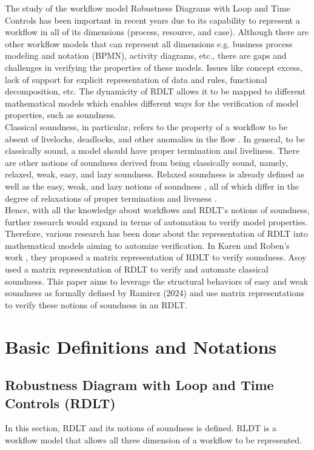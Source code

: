 \indent The study of the workflow model Robustness Diagrams with Loop and Time Controls has been important in recent years due to its capability to represent a workflow in all of its dimensions (process, resource, and case). Although there are other workflow models that can represent all dimensions e.g. business process modeling and notation (BPMN), activity diagrams, etc., there are gaps and challenges in verifying the properties of these models. Issues like concept excess, lack of support for explicit representation of data and rules, functional decomposition, etc. The dynamicity of RDLT allows it to be mapped to different mathematical models which enables different ways for the verification of model properties, such as soundness. \cite{Malinao2017} \\

\indent Classical soundness, in particular, refers to the property of a workflow to be absent of livelocks, deadlocks, and other anomalies in the flow \cite{Ramirez2024}. In general, to be classically sound, a model should have proper termination and liveliness. There are other notions of soundness derived from being classically sound, namely, relaxed, weak, easy, and lazy soundness. Relaxed soundness \cite{MalinaoPJS2023} is already defined as well as the easy, weak, and lazy notions of soundness \cite{Ramirez2024}, all of which differ in the degree of relaxations of proper termination and liveness \cite{MalinaoPJS2023}.\\  

\indent Hence, with all the knowledge about workflows and RDLT's notions of soundness, further research would expand in terms of automation to verify model properties. Therefore, various research has been done about the representation of RDLT into mathematical models aiming to automize verification. In Karen and Roben's work \cite{KarenRoben2018}, they proposed a matrix representation of RDLT to verify soundness. Asoy \cite{MalinaoPJS2023} used a matrix representation of RDLT to verify and automate classical soundness. This paper aims to leverage the structural behaviors of easy and weak soundness as formally defined by Ramirez (2024) and use matrix representations to verify these notions of soundness in an RDLT.


\section{Basic Definitions and Notations}
\subsection*{Robustness Diagram with Loop and Time Controls (RDLT)}
In this section, RDLT and its notions of soundness is defined. 
\indent RLDT is a workflow model that allows all three dimension of a workflow to be represented.

